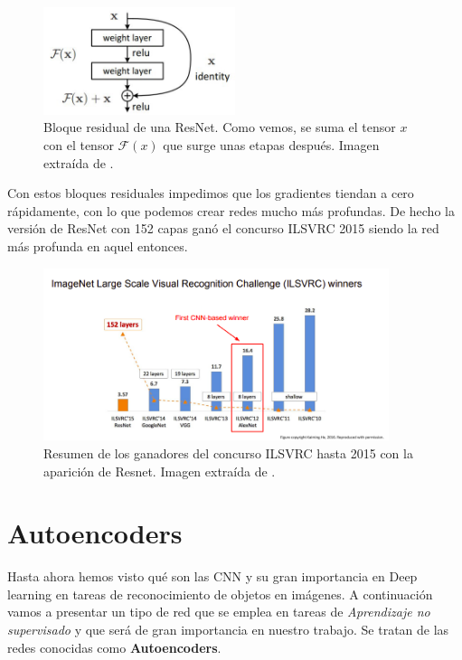             \begin{figure}[!h]
                \centering
                \includegraphics[width=0.5\textwidth]{img/resnet_module.jpeg}
                \caption{Bloque residual de una ResNet. Como vemos, se suma el tensor $x$ con el tensor $\mathcal{F}(x)$ que surge unas etapas después. Imagen extraída de \cite{he2016deep}.}
                \label{fig:Resnet}
            \end{figure}
            
            \noindent Con estos bloques residuales impedimos que los gradientes tiendan a cero rápidamente, con lo que podemos crear redes mucho más profundas. De hecho la versión de ResNet con 152 capas ganó el concurso ILSVRC 2015 siendo la red más profunda en aquel entonces. 

            \begin{figure}[!h]
                \centering
                \includegraphics[width=0.9\textwidth]{img/ImageNet.png}
                \caption{Resumen de los ganadores del concurso ILSVRC hasta 2015 con la aparición de Resnet. Imagen extraída de \cite{StanfordCourse}.}
                \label{fig:ImageNet}
            \end{figure}

\section{Autoencoders}
    \noindent Hasta ahora hemos visto qué son las CNN y su gran importancia en Deep learning en tareas de reconocimiento de objetos en imágenes. A continuación vamos a presentar un tipo de red que se emplea en tareas de \textit{Aprendizaje no supervisado} y que será de gran importancia en nuestro trabajo. Se tratan de las redes conocidas como \textbf{Autoencoders}.

